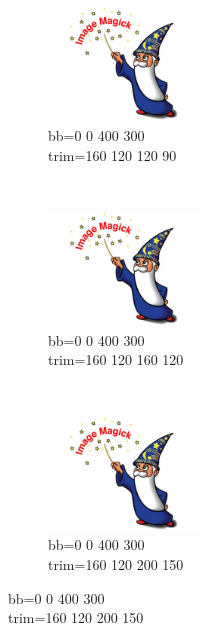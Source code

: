 \begin{figure}[h]
\begin{subfigure}[b]{0.3\textwidth}
        \includegraphics[bb=0 0 400 300,trim=160 120 120 90,width=4cm,height=3cm,clip=true]{test.jpg}
        \caption{bb=0 0 400 300\\trim=160 120 120 90}%
        \label{essai_4}
    \end{subfigure}
    ~
    \begin{subfigure}[b]{0.3\textwidth}
        \includegraphics[bb=0 0 400 300,trim=160 120 160 120,width=4cm,height=3cm,clip=true]{test.jpg}
        \caption{bb=0 0 400 300\\trim=160 120 160 120}%
        \label{essai_5}
    \end{subfigure}
    ~
    \begin{subfigure}[b]{0.3\textwidth}
        \includegraphics[bb=0 0 400 300,trim=160 120 200 150,width=4cm,height=3cm,clip=true]{test.jpg}
        \caption{bb=0 0 400 300\\trim=160 120 200 150}%

\end{subfigure}
\end{figure}
